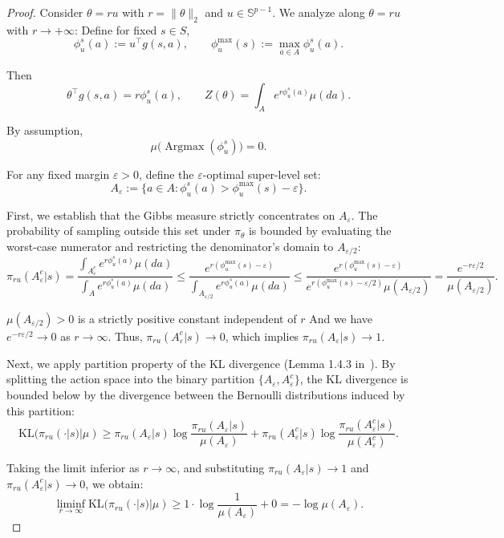 \documentclass{amsart}
\theoremstyle{definition}
\begin{document}
\KLUBAFFINE*

\begin{proof}            
Consider $\theta = r u$ with $r = \|\theta\|_2$ and $u \in \mathbb{S}^{p-1}$. 
We analyze along $ \theta = r u $ with $ r \to +\infty $:
Define for fixed $s \in S$,
\[
\phi^s_u(a) := u^\top g(s,a),
\qquad
\phi_u^{\max}(s) := \max_{a \in A} \phi^s_u(a).
\]

Then
\[
\theta^\top g(s,a) = r \phi^s_u(a),
\qquad
Z(\theta) = \int_{A} e^{r \phi^s_u(a)} \mu(da).
\]

By assumption,
\[
\mu\bigl(\operatorname{Argmax}(\phi^s_u)\bigr) = 0.
\]

For any fixed margin $\varepsilon > 0$, define the $\varepsilon$-optimal super-level set:
\[
A_\varepsilon := \{ a \in A : \phi^s_u(a) > \phi_u^{\max}(s) - \varepsilon \}.
\]

First, we establish that the Gibbs measure strictly concentrates on $A_\varepsilon$. 
The probability of sampling outside this set under $\pi_\theta$ is bounded by evaluating the worst-case numerator and restricting the denominator's domain to $A_{\varepsilon/2}$:
\[
\pi_{ru}(A_\varepsilon^c | s) = \frac{\int_{A_\varepsilon^c} e^{r \phi^s_u(a)} \mu(da)}{\int_A e^{r \phi^s_u(a)} \mu(da)} \le \frac{e^{r(\phi_u^{\max}(s) - \varepsilon)}}{\int_{A_{\varepsilon/2}} e^{r \phi^s_u(a)} \mu(da)} \le \frac{e^{r(\phi_u^{\max}(s) - \varepsilon)}}{e^{r(\phi_u^{\max}(s) - \varepsilon/2)} \mu(A_{\varepsilon/2})} = \frac{e^{-r\varepsilon/2}}{\mu(A_{\varepsilon/2})}.
\]

$\mu(A_{\varepsilon/2}) > 0$ is a strictly positive constant independent of $r$
And we have $e^{-r\varepsilon/2} \to 0$ as $r \to \infty$. Thus, $\pi_{ru}(A_\varepsilon^c | s) \to 0$, which implies $\pi_{ru}(A_\varepsilon | s) \to 1$.

Next, we apply partition property of the KL divergence (Lemma 1.4.3 in~\cite{dupuis2011weak}). 
By splitting the action space into the binary partition $\{A_\varepsilon, A_\varepsilon^c\}$, the KL divergence is bounded below by the divergence between the Bernoulli distributions induced by this partition:
\[
\mathrm{KL}(\pi_{ru}(\cdot |s) | \mu) \ge \pi_{ru}(A_\varepsilon | s) \log \frac{\pi_{ru}(A_\varepsilon | s)}{\mu(A_\varepsilon)} + \pi_{ru}(A_\varepsilon^c | s) \log \frac{\pi_{ru}(A_\varepsilon^c | s)}{\mu(A_\varepsilon^c)}.
\]

Taking the limit inferior as $r \to \infty$, and substituting $\pi_{ru}(A_\varepsilon | s) \to 1$ and $\pi_{ru}(A_\varepsilon^c | s) \to 0$, we obtain:
\[
\liminf_{r \to \infty} \mathrm{KL}(\pi_{ru}(\cdot |s) | \mu) \ge 1 \cdot \log \frac{1}{\mu(A_\varepsilon)} + 0 = -\log \mu(A_\varepsilon).
\]


\end{proof}
\end{document}
